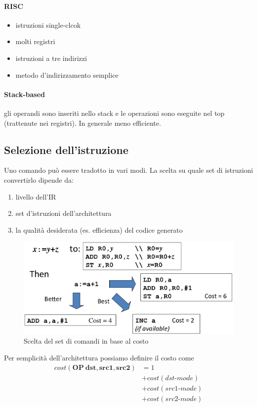 \paragraph{RISC}
\begin{itemize}
\item istruzioni single-clcok
\item molti registri
\item istruzioni a tre indirizzi
\item metodo d'indirizzamento semplice
\end{itemize}
\paragraph{Stack-based}
gli operandi sono inseriti nello stack e le operazioni sono eseguite nel top
(trattenute nei registri). In generale meno efficiente.

\subsection{Selezione dell'istruzione}
Uno comando pu\`o essere tradotto in vari modi. La scelta su quale set di
istruzioni convertirlo dipende da:
\begin{enumerate}
\item livello dell'IR
\item set d'istruzioni dell'architettura
\item la qualit\`a desiderata (es. efficienza) del codice generato
\end{enumerate}

\begin{figure}[H]
  \centering
  \includegraphics[scale=0.35]{res/image/choice_cost}
  \caption{Scelta del set di comandi in base al costo}
  \label{img:choice_cost}
\end{figure}

Per semplicit\`a dell'architettura possiamo definire il costo come
\begin{align*}
cost(\mathbf{OP \ dst}, \mathbf{src1}, \mathbf{src2})
&= 1 \\
&+ cost(dst\text{-}mode) \\
&+ cost(src1\text{-}mode) \\
&+ cost(src2\text{-}mode)
\end{align*}
